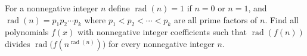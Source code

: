For a nonnegative integer $n$ define $\operatorname{rad}(n) = 1$ if $n = 0$ or $n = 1$, and $\operatorname{rad}(n) = p_1 p_2 \cdots p_k$ where $p_1 < p_2 < \cdots < p_k$ are all prime factors of $n$. Find all polynomials $f(x)$ with nonnegative integer coefficients such that $\operatorname{rad}(f(n))$ divides $\operatorname{rad}\bigl(f(n^{\operatorname{rad}(n)})\bigr)$ for every nonnegative integer $n$.
